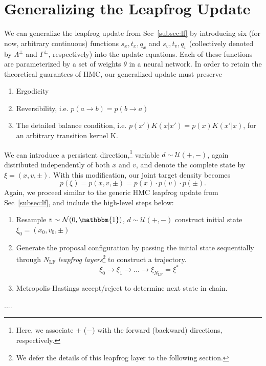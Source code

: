 \documentclass[a4paper,11pt]{article}
\begin{document}
\section{\label{sec:l2hmc}Generalizing the Leapfrog Update}
%
We can generalize the leapfrog update from Sec~\ref{subsec:lf} by introducing
six (for now, arbitrary continuous) functions \(s_{x}, t_{x}, q_{x}\) and
\(s_{v}, t_{v}, q_{v}\) (collectively denoted by \(\Lambda^{\pm}\) and
\(\Gamma^{\pm}\), respectively) into the update equations.
%
Each of these functions are parameterized by a set of weights \(\theta\) in a
neural network.
%
In order to retain the theoretical guarantees of HMC, our generalized update
must preserve
%
\begin{enumerate}
    \item Ergodicity
    \item Reversibility, i.e. \(p(a \rightarrow b) = p(b \rightarrow a)\)
    \item The detailed balance condition, i.e. \(p(x') K(x|x') = p(x)
        K(x'|x)\), for an arbitrary transition kernel K.
\end{enumerate}
%
We can introduce a persistent direction,\footnote{%
    Here, we associate \(+\) (\(-\)) with the forward (backward) directions, respectively.
}
variable \(d \sim \mathcal{U}(+, -)\), again distributed independently of both
\(x\) and \(v\), and denote the complete state by \(\xi = (x, v, \pm)\).
%
With this modification, our joint target density becomes
%
\begin{equation}
    p(\xi) = p(x, v, \pm) = p(x)\cdot p(v)\cdot p(\pm).
\end{equation}
%
Again, we proceed similar to the generic HMC leapfrog update from
Sec~\ref{subsec:lf}, and include the high-level steps below:
%
\begin{enumerate}
    \item Resample \(v \sim \mathcal{N} (0, \mathbbm{1})\), \(d \sim
        \mathcal{U} (+, -)\) construct initial state \(\xi_{0} = (x_{0}, v_{0},
        \pm)\)
    \item Generate the proposal configuration by passing the initial state
        sequentially through \(N_{\mathrm{LF}}\)
        \emph{leapfrog layers}\footnote{%
            We defer the details of this leapfrog layer to the following
            section.
        } to construct a trajectory.
	    \begin{equation}
            \xi_{0} \longrightarrow \xi_{1} \longrightarrow \ldots \longrightarrow \xi_{N_{\mathrm{LF}}} = \xi^{\ast}
        \end{equation}
    \item Metropolis-Hastings accept/reject to determine next state in chain.
\end{enumerate}




%
%
\begin{thebibliography}{99}
....

\end{thebibliography}
\end{document}
